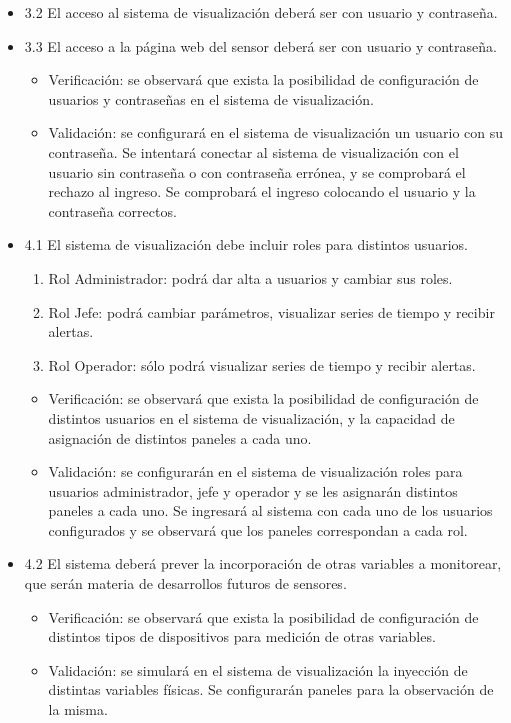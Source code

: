\documentclass[11pt]{proyecto}
\begin{document}
\begin{itemize}
\item 3.2 El acceso al sistema de visualización deberá ser con usuario y contraseña.
\item 3.3 El acceso a la página web del sensor deberá ser con usuario y contraseña.
\begin{itemize}
\item Verificación: se observará que exista la posibilidad de configuración de usuarios y contraseñas en el sistema de visualización.
\item Validación: se configurará en el sistema de visualización un usuario con su contraseña. Se intentará conectar al sistema de visualización con el usuario sin contraseña o con contraseña errónea, y se comprobará el rechazo al ingreso. Se comprobará el ingreso colocando el usuario y la contraseña correctos.
\end{itemize}

\item 4.1 El sistema de visualización debe incluir roles para distintos usuarios.
		 \begin{enumerate}
		 \item Rol Administrador: podrá dar alta a usuarios y cambiar sus roles.
	     \item Rol Jefe: podrá cambiar parámetros, visualizar series de tiempo y recibir alertas.
	     \item Rol Operador: sólo podrá visualizar series de tiempo y recibir alertas.
	     \end{enumerate}
\begin{itemize}
\item Verificación: se observará que exista la posibilidad de configuración de distintos usuarios en el sistema de visualización, y la capacidad de asignación de distintos paneles a cada uno. 
\item Validación: se configurarán en el sistema de visualización roles para usuarios administrador, jefe y operador y se les asignarán distintos paneles a cada uno. Se ingresará al sistema con cada uno de los usuarios configurados y se observará que los paneles correspondan a cada rol.
\end{itemize}
	     
\item 4.2 El sistema deberá prever la incorporación de otras variables a monitorear, que serán materia de desarrollos futuros de sensores.
\begin{itemize}
\item Verificación: se observará que exista la posibilidad de configuración de distintos tipos de dispositivos para medición de otras variables. 
\item Validación: se simulará en el sistema de visualización la inyección de distintas variables físicas. Se configurarán paneles para la observación de la misma.
\end{itemize}


\end{itemize}
\end{document}
